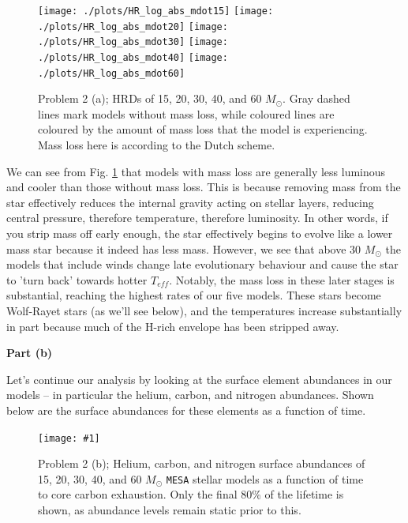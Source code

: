 \documentclass[11pt]{article}
\newcommand{\msol}{M_\odot}
\newcommand\plotoneman[2]{\centering \leavevmode
  \texttt{[image: \#1]}}
\begin{document}
\begin{figure}
\center
\texttt{[image: ./plots/HR\_log\_abs\_mdot15]}
\texttt{[image: ./plots/HR\_log\_abs\_mdot20]}
\texttt{[image: ./plots/HR\_log\_abs\_mdot30]}
\texttt{[image: ./plots/HR\_log\_abs\_mdot40]}
\texttt{[image: ./plots/HR\_log\_abs\_mdot60]}
  \caption{Problem 2 (a); HRDs of 15, 20, 30, 40, and 60 $\msol$. Gray dashed lines mark models without mass loss, while coloured lines are coloured by the amount of mass loss that the    model is experiencing.  Mass loss here is according to the Dutch  scheme.}
   \label{fig:p2_a}
\end{figure}

We can see from Fig. \ref{fig:p2_a} that models with mass loss are generally less luminous and cooler than those without mass loss. This is because  removing mass from the star effectively reduces the internal gravity acting on stellar layers, reducing central pressure, therefore temperature, therefore luminosity. In other words, if you strip mass off early enough, the star effectively begins to evolve like a lower mass star because it indeed has less mass. However, we see that above 30 $\msol$ the models that include winds change late evolutionary behaviour and cause the star to 'turn back' towards hotter $T_{eff}$.  Notably, the mass loss in these later stages is substantial, reaching the highest rates of our five models. These stars become Wolf-Rayet stars (as we'll see below), and the temperatures increase substantially in part because much of the H-rich envelope has been
stripped away.


\vspace{0.1in}
\noindent
\textbf{Part (b)}
\vspace{0.1in}

Let's continue our analysis by looking at the surface element abundances in our models -- in particular the helium, carbon, and nitrogen abundances. Shown below are the surface abundances for these elements as a function of time.


\begin{figure}[hbt]
    \plotoneman{plots/p2_b1}{0.4}
    \caption{Problem 2 (b); Helium, carbon, and nitrogen surface
      abundances of 15, 20, 30, 40, and 60 $\msol$ \texttt{MESA}
      stellar models as a function of time to core carbon
      exhaustion. Only the final 80\% of the lifetime is shown, as
      abundance levels remain static prior to this.}
    \label{fig:p2_b1}
\end{figure}
\end{document}
